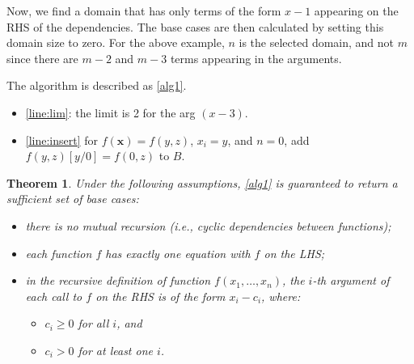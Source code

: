 \documentclass{article}
\newtheorem{theorem}{Theorem}
\begin{document}
Now, we find a domain that has only terms of the form $x-1$ appearing on the RHS
of the dependencies. The base cases are then calculated by setting this domain
size to zero. For the above example, $n$ is the selected domain, and not $m$
since there are $m-2$ and $m-3$ terms appearing in the arguments.

The algorithm is described as \cref{alg1}.


\begin{itemize}
  \item \cref{line:lim}: the limit is 2 for the arg $(x-3)$.
  \item \cref{line:insert} for $f(\mathbf{x}) = f(y, z)$, $x_{i} = y$, and
        $n = 0$, add $f(y, z)[y/0] = f(0, z)$ to $B$.
\end{itemize}


\begin{theorem}
  Under the following assumptions, \cref{alg1} is guaranteed to return a
  sufficient set of base cases:
  \begin{itemize}
    \item there is no mutual recursion (i.e., cyclic dependencies between
          functions);
    \item each function $f$ has exactly one equation with $f$ on the LHS;
    \item in the recursive definition of function $f(x_{1},\dots,x_{n})$, the
          $i$-th argument of each call to $f$ on the RHS is of the form
          $x_{i} - c_{i}$, where:
          \begin{itemize}
            \item $c_{i} \ge 0$ for all $i$, and
            \item $c_{i} > 0$ for at least one $i$.
          \end{itemize}
  \end{itemize}
\end{theorem}
\end{document}
